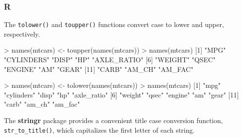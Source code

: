 \documentclass[
]{book}
\newenvironment{Shaded}{\begin{snugshade}}{\end{snugshade}}
\newcommand{\DecValTok}[1]{\textcolor[rgb]{0.00,0.00,0.81}{#1}}
\newcommand{\FunctionTok}[1]{\textcolor[rgb]{0.00,0.00,0.00}{#1}}
\newcommand{\NormalTok}[1]{#1}
\newcommand{\OtherTok}[1]{\textcolor[rgb]{0.56,0.35,0.01}{#1}}
\newcommand{\SpecialCharTok}[1]{\textcolor[rgb]{0.00,0.00,0.00}{#1}}
\newcommand{\StringTok}[1]{\textcolor[rgb]{0.31,0.60,0.02}{#1}}
\begin{document}
\hypertarget{r-20}{%
\subsubsection*{R}\label{r-20}}

The \texttt{tolower()} and \texttt{toupper()} functions convert case to lower and upper, respectively.

\begin{Shaded}
\begin{Highlighting}[]
\SpecialCharTok{\textgreater{}} \FunctionTok{names}\NormalTok{(mtcars) }\OtherTok{\textless{}{-}} \FunctionTok{toupper}\NormalTok{(}\FunctionTok{names}\NormalTok{(mtcars))}
\SpecialCharTok{\textgreater{}} \FunctionTok{names}\NormalTok{(mtcars)}
\NormalTok{ [}\DecValTok{1}\NormalTok{] }\StringTok{"MPG"}        \StringTok{"CYLINDERS"}  \StringTok{"DISP"}       \StringTok{"HP"}         \StringTok{"AXLE\_RATIO"}
\NormalTok{ [}\DecValTok{6}\NormalTok{] }\StringTok{"WEIGHT"}     \StringTok{"QSEC"}       \StringTok{"ENGINE"}     \StringTok{"AM"}         \StringTok{"GEAR"}      
\NormalTok{[}\DecValTok{11}\NormalTok{] }\StringTok{"CARB"}       \StringTok{"AM\_CH"}      \StringTok{"AM\_FAC"}    
\end{Highlighting}
\end{Shaded}

\begin{Shaded}
\begin{Highlighting}[]
\SpecialCharTok{\textgreater{}} \FunctionTok{names}\NormalTok{(mtcars) }\OtherTok{\textless{}{-}} \FunctionTok{tolower}\NormalTok{(}\FunctionTok{names}\NormalTok{(mtcars))}
\SpecialCharTok{\textgreater{}} \FunctionTok{names}\NormalTok{(mtcars)}
\NormalTok{ [}\DecValTok{1}\NormalTok{] }\StringTok{"mpg"}        \StringTok{"cylinders"}  \StringTok{"disp"}       \StringTok{"hp"}         \StringTok{"axle\_ratio"}
\NormalTok{ [}\DecValTok{6}\NormalTok{] }\StringTok{"weight"}     \StringTok{"qsec"}       \StringTok{"engine"}     \StringTok{"am"}         \StringTok{"gear"}      
\NormalTok{[}\DecValTok{11}\NormalTok{] }\StringTok{"carb"}       \StringTok{"am\_ch"}      \StringTok{"am\_fac"}    
\end{Highlighting}
\end{Shaded}

The \textbf{stringr} package provides a convenient title case conversion function, \texttt{str\_to\_title()}, which capitalizes the first letter of each string.
\end{document}
